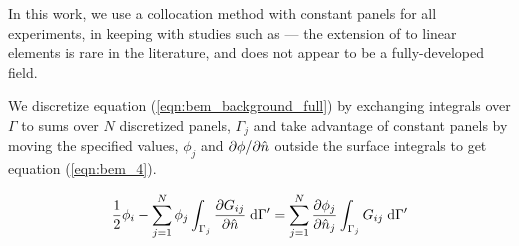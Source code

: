 In this work, we use a collocation method with constant panels for all experiments, in keeping with   {\fmmbem} studies such as \cite{Liu2009} --- the extension of {\fmmbem} to linear elements is rare in the literature, and does not appear to be a fully-developed field. %

%
%
%
%
%
%

We discretize equation (\ref{eqn:bem_background_full}) by exchanging integrals over $\Gamma$ to sums over $N$ discretized panels, $\Gamma_j$ and take advantage of constant panels by moving the specified values, $\phi_j$ and $\partial \phi / \partial \hat{n}$ outside the surface integrals to get equation (\ref{eqn:bem_4}).

\begin{equation}\label{eqn:bem_4}
	\frac{1}{2}\phi_{i} - \sum_{j=1}^{N} \phi_j\int_{\Gamma_{j}}\partiald{G_{ij}}{\hat{n}} \;\di{\Gamma'} = \sum_{j=1}^{N} \partiald{\phi_{j}}{\hat{n}_j}\int_{\Gamma_{j}}G_{ij}\;\di{\Gamma'}
\end{equation}

